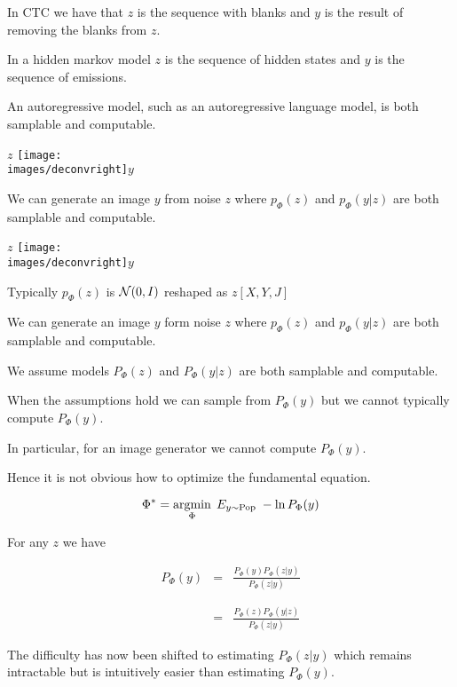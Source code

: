 {In CTC we have that $z$ is the sequence with blanks and $y$ is the result of removing the blanks from $z$.

\vfill
In a hidden markov model $z$ is the sequence of hidden states and $y$ is the sequence of emissions.

\vfill
An autoregressive model, such as an autoregressive language model, is both samplable and computable.


\centerline{$z$ \texttt{[image: \\images/deconvright]}$y$}

\vfill
We can generate an image $y$ from noise $z$ where $p_\Phi(z)$ and $p_\Phi(y|z)$ are both samplable and computable.


\centerline{$z$ \texttt{[image: \\images/deconvright]}$y$}

\vfill
Typically $p_\Phi(z)$ is ${\cal N}(0,I)$ reshaped as $z[X,Y,J]$

\vfill
We can generate an image $y$ form noise $z$ where $p_\Phi(z)$ and $p_\Phi(y|z)$ are both samplable and computable.


\bigskip
\bigskip
We assume models $P_\Phi(z)$ and $P_\Phi(y|z)$ are both samplable and computable.

\vfill
When the assumptions hold we can sample from $P_\Phi(y)$ but we cannot typically compute $P_\Phi(y)$.

\vfill
In particular, for an image generator we cannot compute $P_\Phi(y)$.

\vfill
Hence it is not obvious how to optimize the fundamental equation.

$$\Phi^* = \operatorname*{argmin}_\Phi\;E_{y \sim \mathrm{Pop}}\;- \ln P_\Phi(y)$$


For any $z$ we have

\vfill
\begin{eqnarray*}
P_\Phi(y) & = & \frac{P_\Phi(y)P_\Phi(z|y)}{P_\Phi(z|y)} \\
\\
\\
& = & \frac{P_\Phi(z) P_\Phi(y|z)}{P_\Phi(z|y)}
\end{eqnarray*}

\vfill
The difficulty has now been shifted to estimating $P_\Phi(z|y)$ which remains intractable but is intuitively easier than estimating $P_\Phi(y)$.

}
